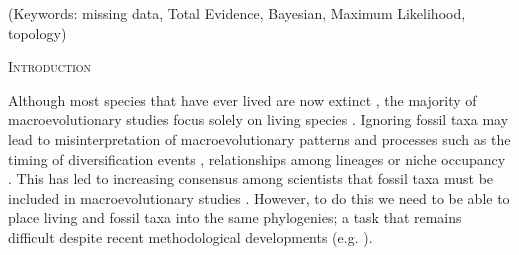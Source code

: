 \documentclass[12pt,letterpaper]{article}
\renewcommand{\section}[1]{%
\bigskip
\begin{center}
\begin{Large}
\normalfont\scshape #1
\medskip
\end{Large}
\end{center}}
\begin{document}
\noindent (Keywords: missing data, Total Evidence, Bayesian, Maximum Likelihood, topology)\\

\vspace{1.5in}

\newpage 

%
%

\section{Introduction}

Although most species that have ever lived are now extinct %
    \citep{novacek1992ext,raup1993extinction}, the majority of macroevolutionary studies focus solely on living species \citep[e.g.][]{meredithimpacts2011,jetzthe2012}. %
Ignoring fossil taxa may lead to misinterpretation of macroevolutionary patterns and processes such as the timing of diversification events \citep[e.g.][]{pyrondivergence2011}, relationships among lineages \citep[e.g.][]{manosphylogeny2007} or niche occupancy \citep[e.g.][]{pearmanniche2008}.
This has led to increasing consensus among scientists that fossil taxa must be included in macroevolutionary studies \citep{jacksonwhat2006,quentaldiversity2010,dietlconservation2011,slaterunifying2013,fritzdiversity2013}.
However, to do this we need to be able to place living and fossil taxa into the same phylogenies; a task that remains difficult despite recent methodological developments (e.g. \citealp{pyrondivergence2011,ronquista2012,schragocombining2013}). %
\end{document}

